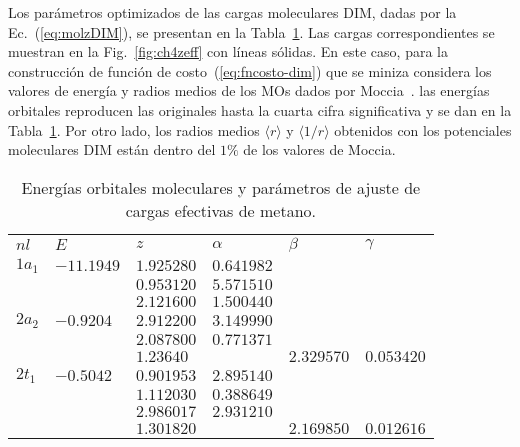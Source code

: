 {{{{Los parámetros optimizados de las cargas moleculares DIM, dadas por la 
Ec.~(\ref{eq:molzDIM}), se presentan en la Tabla~\ref{tab:ch4parameters}. 
Las cargas correspondientes se muestran en la Fig.~\ref{fig:ch4zeff} con 
líneas sólidas. En este caso, para la construcción de función de 
costo~(\ref{eq:fncosto-dim}) que se miniza considera los valores de 
energía y radios medios de los MOs dados por Moccia~\cite{Moccia:69}. 
las energías orbitales reproducen las originales hasta la cuarta cifra 
significativa y se dan en la Tabla~\ref{tab:ch4parameters}. Por otro 
lado, los radios medios $\langle r\rangle$ y $\langle 1/r\rangle$ 
obtenidos con los potenciales moleculares DIM están dentro del $1\%$ 
de los valores de Moccia.

\begin{table}[t]
\centering
\begin{tabular}{
>{\centering\arraybackslash}p{}
>{\centering\arraybackslash}p{}
>{\centering\arraybackslash}p{}
>{\centering\arraybackslash}p{}
>{\centering\arraybackslash}p{}
>{\centering\arraybackslash}p{}}
\rowcolor{mydarkgray} 
   $nl$ & $E$        & $z$        & $\alpha$   & $\beta$ & $\gamma$ \\
$1a_1$  & $-11.1949$ & $1.925280$ & $0.641982$ & & \\
\rowcolor{mygray} 
        &            & $0.953120$ & $5.571510$ & & \\
        &            & $2.121600$ & $1.500440$ & & \\
\rowcolor{mygray} 
$2a_2$  & $-0.9204$  & $2.912200$ & $3.149990$ & & \\
        &            & $2.087800$ & $0.771371$ & & \\
\rowcolor{mygray} 
        &            & $1.23640$  &            & $2.329570$ & $0.053420$ \\
$2t_1$  & $-0.5042$  & $0.901953$ & $2.895140$ & & \\
\rowcolor{mygray} 
        &            & $1.112030$ & $0.388649$ & & \\
        &            & $2.986017$ & $2.931210$ & & \\
\rowcolor{mygray} 
        &            & $1.301820$ &            & $2.169850$ & $0.012616$ \\ 
\end{tabular}
\caption[Energías y parámetros de ajuste de cargas efectivas de metano.]
{Energías orbitales moleculares y parámetros de ajuste de cargas 
efectivas de metano.}
\label{tab:ch4parameters}
\end{table}

}}}}
